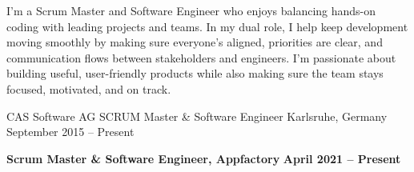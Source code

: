 \documentclass[10pt, a4paper]{cvhari}
\begin{document}

\makecvheader
\medskip



    \par
    I’m a Scrum Master and Software Engineer who enjoys balancing hands-on coding with leading projects and teams. In my dual role, I help keep development moving smoothly by making sure everyone’s aligned, priorities are clear, and communication flows between stakeholders and engineers. I’m passionate about building useful, user-friendly products while also making sure the team stays focused, motivated, and on track.
    \par
\medskip



    \company
        {CAS Software AG}
        {SCRUM Master \& Software Engineer}
        {Karlsruhe, Germany}
        {September 2015 -- Present}
    \vspace{0.5em}

    \textbf{Scrum Master \& Software Engineer, Appfactory} \hfill \textbf{April 2021 -- Present}

    \vspace{0.2em}
\end{document}
